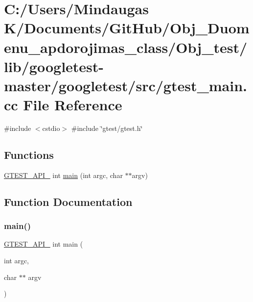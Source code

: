 \hypertarget{_obj__test_2lib_2googletest-master_2googletest_2src_2gtest__main_8cc}{}\section{C\+:/\+Users/\+Mindaugas K/\+Documents/\+Git\+Hub/\+Obj\+\_\+\+Duomenu\+\_\+apdorojimas\+\_\+class/\+Obj\+\_\+test/lib/googletest-\/master/googletest/src/gtest\+\_\+main.cc File Reference}
\label{_obj__test_2lib_2googletest-master_2googletest_2src_2gtest__main_8cc}
{\ttfamily \#include $<$cstdio$>$}\newline
{\ttfamily \#include \char`\"{}gtest/gtest.\+h\char`\"{}}\newline
\subsection*{Functions}
\begin{DoxyCompactItemize}
\item 
\mbox{\hyperlink{_obj__test_2lib_2googletest-release-1_88_81_2googletest_2include_2gtest_2internal_2gtest-port_8h_aa73be6f0ba4a7456180a94904ce17790}{G\+T\+E\+S\+T\+\_\+\+A\+P\+I\+\_\+}} int \mbox{\hyperlink{_obj__test_2lib_2googletest-master_2googletest_2src_2gtest__main_8cc_a7f83bdc516d2cb86e20235d94ddf055a}{main}} (int argc, char $\ast$$\ast$argv)
\end{DoxyCompactItemize}


\subsection{Function Documentation}
\mbox{\label{_obj__test_2lib_2googletest-master_2googletest_2src_2gtest__main_8cc_a7f83bdc516d2cb86e20235d94ddf055a}} 
\subsubsection{\texorpdfstring{main()}{main()}}
{\footnotesize\ttfamily \mbox{\hyperlink{_obj__test_2lib_2googletest-release-1_88_81_2googletest_2include_2gtest_2internal_2gtest-port_8h_aa73be6f0ba4a7456180a94904ce17790}{G\+T\+E\+S\+T\+\_\+\+A\+P\+I\+\_\+}} int main (\begin{DoxyParamCaption}\item[{int}]{argc,  }\item[{char $\ast$$\ast$}]{argv }\end{DoxyParamCaption})}

